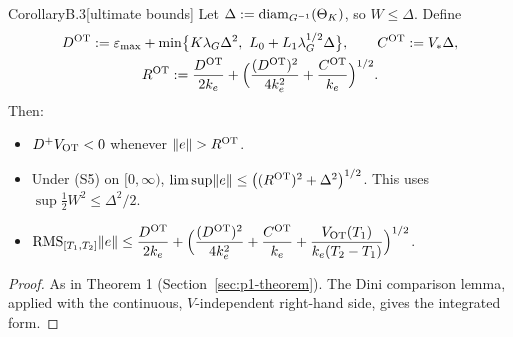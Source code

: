 \begin{thm}{Corollary}{B.3}[ultimate bounds]
Let $\Delta:=\operatorname{diam}_{G^{-1}}(\Theta_K)$, so $W\le\Delta$. Define
\begin{gather*}
  D^{\mathrm{OT}}:=\varepsilon_{\max}+\min\bigl\{K\lambda_G\Delta^2,\ L_0+L_1\lambda_G^{1/2}\Delta\bigr\},\qquad
  C^{\mathrm{OT}}:=V_*\Delta,\\
  R^{\mathrm{OT}}:=\frac{D^{\mathrm{OT}}}{2k_e}
    +\Bigl(\frac{(D^{\mathrm{OT}})^2}{4k_e^2}+\frac{C^{\mathrm{OT}}}{k_e}\Bigr)^{1/2}.
\end{gather*}
Then:
\begin{itemize}
\item $D^+V_{\mathrm{OT}}<0$ whenever $\lVert e\rVert>R^{\mathrm{OT}}$.
\item Under (S5) on $[0,\infty)$, $\limsup\lVert e\rVert\le\bigl((R^{\mathrm{OT}})^2+\Delta^2\bigr)^{1/2}$. This uses
  $\sup\frac12W^2\le\Delta^2/2$.
\item $\displaystyle \operatorname{RMS}_{[T_1,T_2]}\lVert e\rVert\le\frac{D^{\mathrm{OT}}}{2k_e}
  +\Bigl(\frac{(D^{\mathrm{OT}})^2}{4k_e^2}+\frac{C^{\mathrm{OT}}}{k_e}
  +\frac{V_{\mathrm{OT}}(T_1)}{k_e(T_2-T_1)}\Bigr)^{1/2}$.
\end{itemize}
\end{thm}

\begin{proof}
As in Theorem 1 (Section~\ref{sec:p1-theorem}). The Dini comparison lemma, applied with the continuous,
$V$-independent right-hand side, gives the integrated form.
\end{proof}

